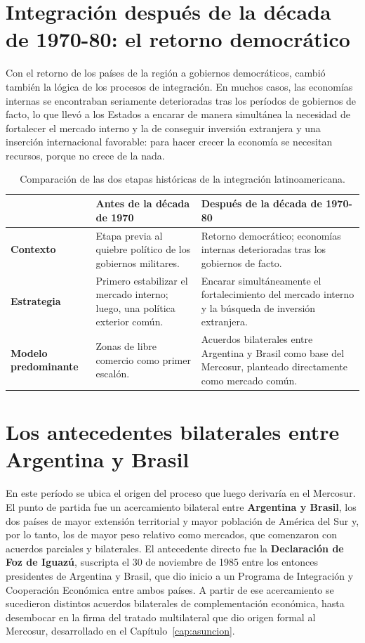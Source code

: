 \documentclass[12pt,oneside]{book}
\begin{document}
\section{Integración después de la década de 1970-80: el retorno democrático}

Con el retorno de los países de la región a gobiernos democráticos, cambió también la lógica de los procesos de integración. En muchos casos, las economías internas se encontraban seriamente deterioradas tras los períodos de gobiernos de facto, lo que llevó a los Estados a encarar de manera simultánea la necesidad de fortalecer el mercado interno y la de conseguir inversión extranjera y una inserción internacional favorable: para hacer crecer la economía se necesitan recursos, porque no crece de la nada.

\begin{table}[H]
\centering
\renewcommand{\arraystretch}{1.3}
\begin{tabularx}{\textwidth}{>{\raggedright\arraybackslash}p{}>{\raggedright\arraybackslash}X>{\raggedright\arraybackslash}X}
\toprule
 & \textbf{Antes de la década de 1970} & \textbf{Después de la década de 1970-80} \\
\midrule
\textbf{Contexto} & Etapa previa al quiebre político de los gobiernos militares. & Retorno democrático; economías internas deterioradas tras los gobiernos de facto. \\
\textbf{Estrategia} & Primero estabilizar el mercado interno; luego, una política exterior común. & Encarar simultáneamente el fortalecimiento del mercado interno y la búsqueda de inversión extranjera. \\
\textbf{Modelo predominante} & Zonas de libre comercio como primer escalón. & Acuerdos bilaterales entre Argentina y Brasil como base del Mercosur, planteado directamente como mercado común. \\
\bottomrule
\end{tabularx}
\caption{Comparación de las dos etapas históricas de la integración latinoamericana.}
\end{table}

\section{Los antecedentes bilaterales entre Argentina y Brasil}

En este período se ubica el origen del proceso que luego derivaría en el Mercosur. El punto de partida fue un acercamiento bilateral entre \textbf{Argentina y Brasil}, los dos países de mayor extensión territorial y mayor población de América del Sur y, por lo tanto, los de mayor peso relativo como mercados, que comenzaron con acuerdos parciales y bilaterales. El antecedente directo fue la \textbf{Declaración de Foz de Iguazú}, suscripta el 30 de noviembre de 1985 entre los entonces presidentes de Argentina y Brasil, que dio inicio a un Programa de Integración y Cooperación Económica entre ambos países. A partir de ese acercamiento se sucedieron distintos acuerdos bilaterales de complementación económica, hasta desembocar en la firma del tratado multilateral que dio origen formal al Mercosur, desarrollado en el Capítulo~\ref{cap:asuncion}.
\end{document}
